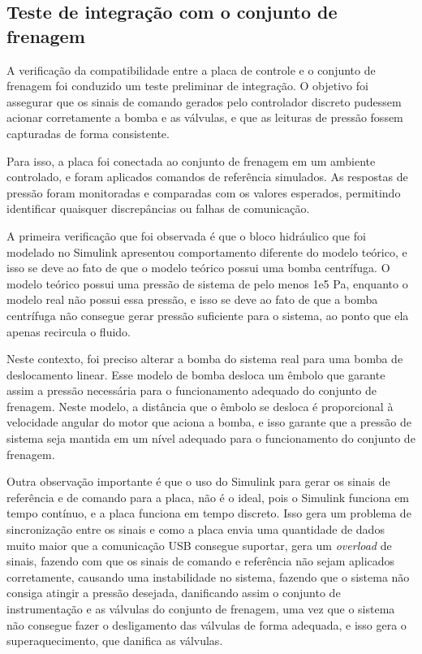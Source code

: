 \subsection{Teste de integração com o conjunto de frenagem}
\label{sec:teste-integracao-frenagem}

A verificação da compatibilidade entre a placa de controle e o conjunto de frenagem foi conduzido um teste preliminar de integração. O objetivo foi assegurar que os sinais de comando gerados pelo controlador discreto pudessem acionar corretamente a bomba e as válvulas, e que as leituras de pressão fossem capturadas de forma consistente.

Para isso, a placa foi conectada ao conjunto de frenagem em um ambiente controlado, e foram aplicados comandos de referência simulados. As respostas de pressão foram monitoradas e comparadas com os valores esperados, permitindo identificar quaisquer discrepâncias ou falhas de comunicação.

A primeira verificação que foi observada é que o bloco hidráulico que foi modelado no Simulink apresentou comportamento diferente do modelo teórico, e isso se deve ao fato de que o modelo teórico possui uma bomba centrífuga. O modelo teórico possui uma pressão de sistema de pelo menos 1e5 Pa, enquanto o modelo real não possui essa pressão, e isso se deve ao fato de que a bomba centrífuga não consegue gerar pressão suficiente para o sistema, ao ponto que ela apenas recircula o fluido.

Neste contexto, foi preciso alterar a bomba do sistema real para uma bomba de deslocamento linear. Esse modelo de bomba desloca um êmbolo que garante assim a pressão necessária para o funcionamento adequado do conjunto de frenagem. Neste modelo, a distância que o êmbolo se desloca é proporcional à velocidade angular do motor que aciona a bomba, e isso garante que a pressão de sistema seja mantida em um nível adequado para o funcionamento do conjunto de frenagem.

Outra observação importante é que o uso do Simulink para gerar os sinais de referência e de comando para a placa, não é o ideal, pois o Simulink funciona em tempo contínuo, e a placa funciona em tempo discreto. Isso gera um problema de sincronização entre os sinais e como a placa envia uma quantidade de dados muito maior que a comunicação USB consegue suportar, gera um \textit{overload} de sinais, fazendo com que os sinais de comando e referência não sejam aplicados corretamente, causando uma instabilidade no sistema, fazendo que o sistema não consiga atingir a pressão desejada, danificando assim o conjunto de instrumentação e as válvulas do conjunto de frenagem, uma vez que o sistema não consegue fazer o desligamento das válvulas de forma adequada, e isso gera o superaquecimento, que danifica as válvulas.

